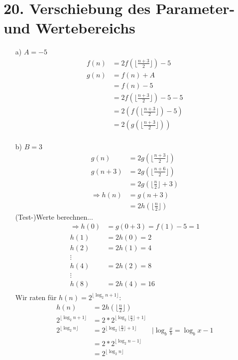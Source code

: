 \documentclass[ngerman,a4paper]{report}
\begin{document}
\section*{20. Verschiebung des Parameter- und Wertebereichs}
\begin{enumerate}
\item[a)] $A = -5$
\begin{align*}
f(n)&=2f(\lfloor \frac{n+3}{2}\rfloor)-5\\
g(n)&=f(n)+A\\
&=f(n)-5\\
&=2f(\lfloor \frac{n+3}{2}\rfloor)-5-5\\
&=2(f(\lfloor \frac{n+3}{2}\rfloor)-5)\\
&=2(g(\lfloor \frac{n+3}{2}\rfloor))\\
\end{align*}
\item[b)] $B = 3$
\begin{align*}
g(n)&=2g(\lfloor \frac{n+3}{2}\rfloor)\\
g(n+3)&=2g(\lfloor \frac{n+6}{2}\rfloor)\\
&=2g(\lfloor \frac{n}{2}\rfloor+3)\\
\Rightarrow h(n) &= g(n+3)\\
&= 2h(\lfloor \frac{n}{2}\rfloor)
\end{align*}
(Test-)Werte berechnen...
\begin{align*}
\Rightarrow h(0) &= g(0+3) = f(1) - 5 = 1\\
h(1) &= 2h(0) = 2\\
h(2) &= 2h(1) = 4\\
\vdots\\
h(4) &= 2h(2) = 8\\
\vdots\\
h(8) &= 2h(4) =16\\
\end{align*}
Wir raten für $h(n) = 2^{\lfloor \log_2 n+1 \rfloor}$:\\
\begin{align*}
h(n) &= 2h({\lfloor \frac{n}{2} \rfloor})\\
2^{\lfloor \log_2 n +1 \rfloor} &= 2*2^{\lfloor \log_2 \lfloor{\frac{n}{2}}\rfloor +1\rfloor}\\
2^{\lfloor \log_2 n \rfloor} &= 2^{\lfloor \log_2\lfloor \frac{n}{2}\rfloor+1\rfloor}&| \log_b \frac{x}{b} = \log_b x -1\\
&= 2 * 2^{\lfloor \log_2 n-1\rfloor} \\
&= 2^{\lfloor \log_2 n\rfloor}\\

\end{align*}
\end{enumerate}
\end{document}

